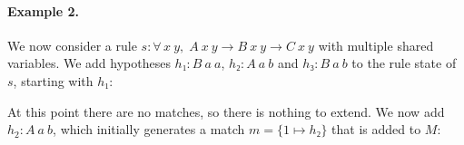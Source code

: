 \documentclass[runningheads]{llncs}
\newcommand{\All}[2]{\ensuremath{\forall\, #1,\; #2}}
\begin{document}
\paragraph{Example 2.}
We now consider a rule $s : \All{x~y}{A~x~y → B~x~y → C~x~y}$ with multiple shared variables.
We add hypotheses $h₁ : B~a~a$, $h₂ : A~a~b$ and $h₃ : B~a~b$ to the rule state of $s$, starting with $h₁$:
\begin{center}
\end{center}
At this point there are no matches, so there is nothing to extend.
We now add $h_2 : A~a~b$, which initially generates a match $m = \{1 ↦ h₂\}$ that is added to $M$:
\end{document}
